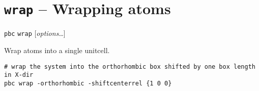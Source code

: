 \documentclass[a4paper, DIV12]{scrartcl}
\begin{document}
\newpage
\section{\texttt{wrap} -- Wrapping atoms}
\label{sec:wrap}


\texttt{pbc} \texttt{wrap} [\textit{options}\dots]


Wrap atoms into a single unitcell.


\begin{Verbatim}
# wrap the system into the orthorhombic box shifted by one box length in X-dir
pbc wrap -orthorhombic -shiftcenterrel {1 0 0}
\end{Verbatim}


\end{document}
